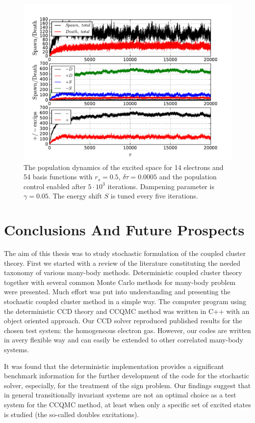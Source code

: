 \documentclass[twoside,english]{uiofysmaster}
\begin{document}
\begin{landscape}
	
	\begin{figure}[ht!]
		\centering
		\includegraphics[width=0.8\linewidth]{platFindStune}
		\caption{The population dynamics of the excited space for 14 electrons and 54 basis functions with $r_s=0.5$, $\delta \tau=0.0005$ and the population control enabled after $5\cdot 10^3$ iterations. Dampening parameter is $\gamma = 0.05$. The energy shift $S$ is tuned every five iterations.}
		\label{fig:platFindStune}
	\end{figure}
	
\end{landscape}


\chapter{Conclusions And Future Prospects}

The aim of this thesis was to study stochastic formulation of the
coupled cluster theory.  First we started with a review of the
literature constituting the needed taxonomy of various many-body methods.  Deterministic
coupled cluster theory together with several common Monte Carlo methods
for many-body problem were presented. Much effort was put into
understanding and presenting the stochastic coupled cluster method in
a simple way.  The computer program using the deterministic CCD theory
and CCQMC method was written in C++ with an object oriented approach. Our
CCD solver reproduced published results for the chosen test system: the
homogeneous electron gas. However, our codes are written in  avery flexible way and can easily be extended to other correlated many-body systems.

It was found that the deterministic
implementation provides a significant benchmark information for the
further development of the code for the stochastic solver, especially,
for the treatment of the sign problem. Our findings suggest that in
general transitionally invariant systems are not an optimal choice as
a test system for the CCQMC method, at least when only  a specific set of excited states is studied (the so-called doubles excitations).
\end{document}
